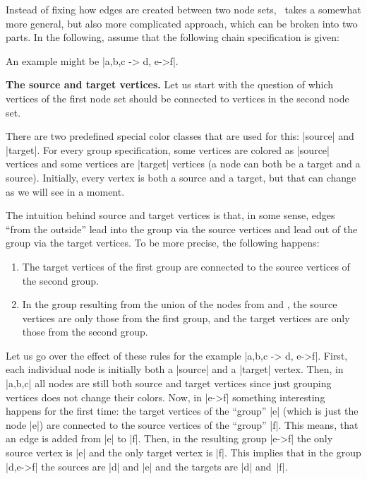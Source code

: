Instead of fixing how edges are created between two node sets,
\tikzname\ takes a somewhat more general, but also more complicated
approach, which can be broken into two parts. In the following, assume
that the following chain specification is given:
\begin{quote}
    
\end{quote}
An example might be |{a,b,c} -> {d, e->f}|.

\medskip
\textbf{The source and target vertices.} Let us start with the
question of which vertices of the first node set should be connected to
vertices in the second node set.

There are two predefined special color classes that are used for this:
|source| and |target|. For every group specification, some vertices
are colored as |source| vertices and some vertices are |target|
vertices (a node can both be a target and a source). Initially, every
vertex is both a source and a target, but that can change as we will
see in a moment.

The intuition behind source and target vertices is that, in some
sense, edges ``from the outside'' lead into the group via the source
vertices and lead out of the group via the target vertices. To be more
precise, the following happens:
\begin{enumerate}
\item The target vertices of the first group are connected to
  the source vertices of the second group.
\item In the group resulting from the union of the nodes from
   and , the source vertices are only
  those from the first group, and the target vertices are only those
  from the second group.
\end{enumerate}

Let us go over the effect of these rules for the example
|{a,b,c} -> {d, e->f}|. First, each individual node is initially both
a |source| and a |target| vertex. Then, in |{a,b,c}| all nodes are
still both source and target vertices since just grouping vertices
does not change their colors. Now, in |e->f| something interesting
happens for the first time: the target vertices of the ``group'' |e|
(which is just the node |e|) are connected to the source vertices of
the ``group'' |f|. This means, that an edge is added from |e| to
|f|. Then, in the resulting group |e->f| the only source vertex is |e|
and the only target vertex is |f|. This implies that in the group
|{d,e->f}| the sources are |d| and |e| and the targets are |d| and~|f|.

